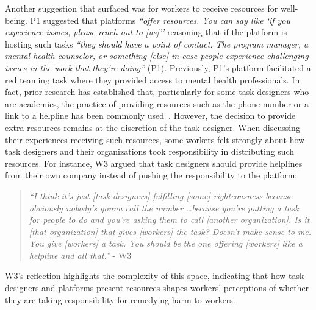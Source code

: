 Another suggestion that surfaced was for workers to receive resources for well-being. P1 suggested that platforms \textit{``offer resources. You can say like `if you experience issues, please reach out to [us]''} reasoning that if the platform is hosting such tasks \textit{``they should have a point of contact. The program manager, a mental health counselor, or something [else] in case people experience challenging issues in the work that they're doing''} (P1). Previously, P1's platform facilitated a red teaming task where they provided access to mental health professionals. In fact, prior research has established that, particularly for some task designers who are academics, the practice of providing resources such as the phone number or a link to a helpline has been commonly used~\cite{qian2025locating, Zhang2024PerceptionsTriggerWarnings}. However, the decision to provide extra resources remains at the discretion of the task designer. When discussing their experiences receiving such resources, some workers felt strongly about how task designers and their organizations took responsibility in distributing such resources. For instance, W3 argued that task designers should provide helplines from their own company instead of pushing the responsibility to the platform:
\begin{quote}
    \textit{``I think it's just [task designers] fulfilling [some] righteousness because obviously nobody's gonna call the number \dots because you're putting a task for people to do and you're asking them to call [another organization]. Is it [that organization] that gives [workers] the task? Doesn't make sense to me. You give [workers] a task. You should be the one offering [workers] like a helpline and all that.''} - W3
\end{quote}
W3's reflection highlights the complexity of this space, indicating that how task designers and platforms present resources shapes workers' perceptions of whether they are taking responsibility for remedying harm to workers. 
